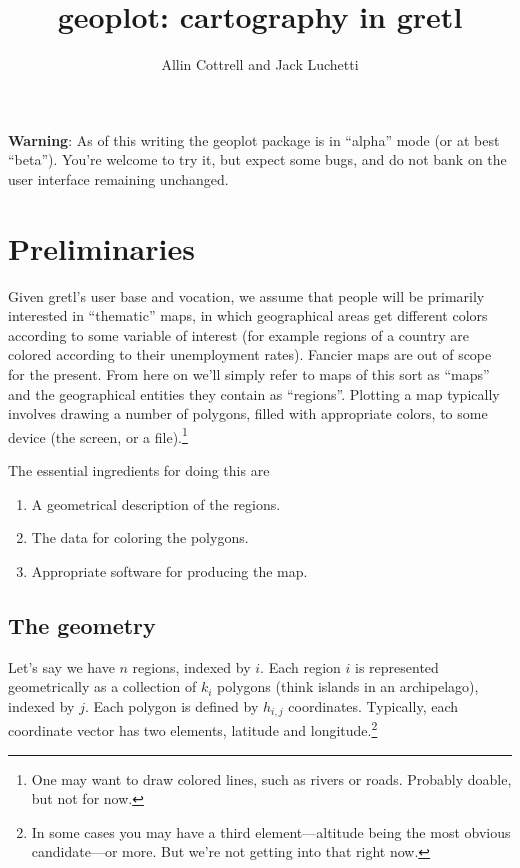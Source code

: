 \documentclass{article}
\title{geoplot: cartography in gretl}
\author{Allin Cottrell and Jack Luchetti}
\begin{document}
\maketitle

\textbf{Warning}: As of this writing the \textsf{geoplot} package is
in ``alpha'' mode (or at best ``beta''). You're welcome to try it, but
expect some bugs, and do not bank on the user interface remaining
unchanged.

\section{Preliminaries}
\label{sec:prelim}

Given gretl's user base and vocation, we assume that people will be
primarily interested in ``thematic'' maps, in which geographical areas
get different colors according to some variable of interest (for
example regions of a country are colored according to their
unemployment rates). Fancier maps are out of scope for the
present. From here on we'll simply refer to maps of this sort as
``maps'' and the geographical entities they contain as
``regions''. Plotting a map typically involves drawing a number of
polygons, filled with appropriate colors, to some device (the screen,
or a file).\footnote{One may want to draw colored lines, such as
  rivers or roads. Probably doable, but not for now.}

The essential ingredients for doing this are
\begin{enumerate}
   \item A geometrical description of the regions.
   \item The data for coloring the polygons.
   \item Appropriate software for producing the map. 
\end{enumerate}
   
\subsection{The geometry}
\label{sec:geometry}

Let's say we have $n$ regions, indexed by $i$. Each region $i$ is
represented geometrically as a collection of $k_i$ polygons (think
islands in an archipelago), indexed by $j$. Each polygon is defined by
$h_{i,j}$ coordinates. Typically, each coordinate vector has two
elements, latitude and longitude.\footnote{In some cases you may have
  a third element---altitude being the most obvious candidate---or
  more.  But we're not getting into that right now.}
\end{document}
